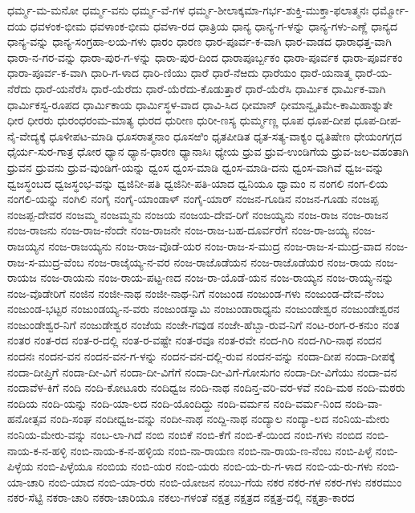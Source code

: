 ಧರ್ಮ್ಮ-ಮ-ಮನೋ
ಧರ್ಮ್ಮ-ವನು
ಧರ್ಮ್ಮ-ವೆ-ಗಳ
ಧರ್ಮ್ಮ-ಶೀಲಾಕ್ಕಮಾ-ಗರ್ಭ-ಶುಕ್ತಿ-ಮುಕ್ತಾ-ಫಲಾತ್ಮನಃ
ಧರ್ಮ್ಮೋ-ದಯ
ಧವಳಂಕ-ಭೀಮ
ಧವಳಾಂಕ-ಭೀಮ
ಧವಳಾ-ರದ
ಧಾತ್ರಿಯ
ಧಾನ್ಯ
ಧಾನ್ಯ-ಗ-ಳನ್ನು
ಧಾನ್ಯ-ಗಳು-ಎಣ್ಣೆ
ಧಾನ್ಯದ
ಧಾನ್ಯ-ವನ್ನು
ಧಾನ್ಯ-ಸಂಗ್ರಹಾ-ಲಯ-ಗಳು
ಧಾರಂ
ಧಾರಣ
ಧಾರ-ಪೂರ್ವ-ಕ-ವಾಗಿ
ಧಾರ-ವಾಡದ
ಧಾರಾಧತ್ತ-ವಾಗಿ
ಧಾರಾ-ನ-ಗರ-ವನ್ನು
ಧಾರಾ-ಪುರ-ಗ-ಳನ್ನು
ಧಾರಾ-ಪುರ-ದಿಂದ
ಧಾರಾಪೂರ್ಬ್ಬಕಂ
ಧಾರಾ-ಪೂರ್ವಕ
ಧಾರಾ-ಪೂರ್ವಕಂ
ಧಾರಾ-ಪೂರ್ವ-ಕ-ವಾಗಿ
ಧಾರಿ-ಗ-ಳಾದ
ಧಾರಿ-ಣಿಯು
ಧಾರೆ
ಧಾರೆ-ನೆಱದು
ಧಾರೆಯಂ
ಧಾರೆ-ಯನಾತ್ಮ
ಧಾರೆ-ಯ-ನೆರೆದು
ಧಾರೆ-ಯನೆರೆಸಿ
ಧಾರೆ-ಯೆರೆದು
ಧಾರೆ-ಯೆರೆದು-ಕೊಡುತ್ತಾರೆ
ಧಾರೆ-ಯೆರೆಸಿ
ಧಾರ್ಮಿಕ
ಧಾರ್ಮಿಕ-ವಾಗಿ
ಧಾರ್ಮಿಕಸ್ವ-ರೂಪದ
ಧಾರ್ಮಿಕಾಯ
ಧಾರ್ಮಿಸ್ಥಳ-ವಾದ
ಧಾವಿ-ಸಿದ
ಧೀಮಾನ್
ಧೀಮಾನ್ವೃತಿಮೇ-ಕಾಮಿಹಾಶ್ನುತೇ
ಧೀರ
ಧೀರರು
ಧುರಂಧರಂಮ-ಮಾತ್ಯ
ಧುರದ
ಧುರೀಣ
ಧುರೀ-ಣಸ್ಯ
ಧುರ್ಮ್ಮಣ್ಣ
ಧೂಪ
ಧೂಪ-ದೀಪ
ಧೂಪ-ದೀಪ-ನೈ-ವೇದ್ಯಕ್ಕೆ
ಧೂಳೀಪಟ-ಮಾಡಿ
ಧೂಸರಾತ್ಮನಾಂ
ಧೂಸಱಿಂ
ಧೃತಪೀಡಿತ
ಧೃತ-ಸತ್ಯ-ವಾಕ್ಯಂ
ಧೃತಿಷೇಣ
ಧೇಯಂಗಗ್ಗದ
ಧೈರ್ಯ-ಸುರ-ಗಾತ್ರ
ಧೋರ
ಧ್ಯಾನ
ಧ್ಯಾನ-ಧಾರಣ
ಧ್ಯಾನಾಸಿಃ
ಧ್ಯೇಯ
ಧ್ರುವ
ಧ್ರುವ-ಉಂಡಿಗೆಯ
ಧ್ರುವ-ಜಲ-ವಹಂತಾಗಿ
ಧ್ರುವನ
ಧ್ರುವನು
ಧ್ರುವ-ವುಂಡಿಗೆ-ಯನ್ನು
ಧ್ವಂಸ
ಧ್ವಂಸ-ಮಾಡಿ
ಧ್ವಂಸ-ಮಾಡಿ-ದನು
ಧ್ವಂಸ-ವಾಗಿವೆ
ಧ್ವಜ-ವನ್ನು
ಧ್ವಜಸ್ಥಂಬದ
ಧ್ವಜಸ್ಥಂಭ-ವನ್ನು
ಧ್ವಜಿನೀ-ಪತಿ
ಧ್ವಜಿನೀ-ಪತಿ-ಯಾದ
ಧ್ವನಿಯೂ
ಧ್ವಾಮಂ
ನ
ನಂಗಲಿ
ನಂಗ-ಲಿಯ
ನಂಗಲಿ-ಯನ್ನು
ನಂಗಿಲಿ
ನಂಗೈ
ನಂಗೈ-ಯಾಂಡಾಳ್
ನಂಗೈ-ಯಾರ್
ನಂಜನ-ಗೂಡಿನ
ನಂಜನ-ಗೂಡು
ನಂಜಪ್ಪ
ನಂಜಪ್ಪ-ದೇವರ
ನಂಜಮ್ಮ
ನಂಜಮ್ಮನು
ನಂಜಯ
ನಂಜಯ-ದೇವ-ರಿಗೆ
ನಂಜಯ್ಯನು
ನಂಜ-ರಾಜ
ನಂಜ-ರಾಜನ
ನಂಜ-ರಾಜನು
ನಂಜ-ರಾಜ-ನೆಂದೇ
ನಂಜ-ರಾಜನೇ
ನಂಜ-ರಾಜ-ಬಹ-ದೂರ್ವರೆಗೆ
ನಂಜ-ರಾ-ಜಯ್ಯ
ನಂಜ-ರಾಜಯ್ಯನ
ನಂಜ-ರಾಜಯ್ಯನು
ನಂಜ-ರಾಜ-ವೊಡೆ-ಯರ
ನಂಜ-ರಾಜ-ಸ-ಮುದ್ರ
ನಂಜ-ರಾಜ-ಸ-ಮುದ್ರ-ವಾದ
ನಂಜ-ರಾಜ-ಸ-ಮುದ್ರ-ವೆಂಬ
ನಂಜ-ರಾಜೈಯ್ಯ-ನ-ವರ
ನಂಜ-ರಾಜೊಡೆಯನ
ನಂಜ-ರಾಜೊಡೆಯರ
ನಂಜ-ರಾಯ
ನಂಜ-ರಾಯಜ
ನಂಜ-ರಾಯನು
ನಂಜ-ರಾಯ-ಪಟ್ಟ-ಣದ
ನಂಜ-ರಾ-ಯೊಡೆ-ಯನ
ನಂಜ-ರಾಯ್ಯನ
ನಂಜ-ರಾಯ್ಯ-ನನ್ನು
ನಂಜ-ವೊಡೇರಿಗೆ
ನಂಜಿನ
ನಂಜೀ-ನಾಥ
ನಂಜೀ-ನಾಥ-ನಿಗೆ
ನಂಜುಂಡ
ನಂಜುಂಡ-ಗಳು
ನಂಜುಂಡ-ದೇವ-ನೆಂಬ
ನಂಜುಂಡ-ಭಟ್ಟರ
ನಂಜುಂಡಯ್ಯ-ನ-ವರು
ನಂಜುಂಡಸ್ವಾಮಿ
ನಂಜುಂಡಾರಾಧ್ಯನು
ನಂಜುಂಡೇಶ್ವರ
ನಂಜುಂಡೇಶ್ವರನ
ನಂಜುಂಡೇಶ್ವರ-ನಿಗೆ
ನಂಜುಡೇಶ್ವರ
ನಂಜೆಯ
ನಂಜೇ-ಗವುಡ
ನಂಜೇ-ಹೆಬ್ಬಾ-ರುವ-ನಿಗೆ
ನಂಟ-ರಂಗ-ರ-ಕನುಂ
ನಂತ
ನಂತರ
ನಂತ-ರದ
ನಂತ-ರ-ದಲ್ಲಿ
ನಂತ-ರ-ವಷ್ಟೇ
ನಂತ-ರವೂ
ನಂತ-ರವೇ
ನಂದ-ಗಿರಿ
ನಂದ-ಗಿರಿ-ನಾಥ
ನಂದನ
ನಂದನಃ
ನಂದನ-ವನ
ನಂದನ-ವನ-ಗ-ಳನ್ನು
ನಂದನ-ವನ-ದಲ್ಲಿ-ರುವ
ನಂದನ-ವನ್ನು
ನಂದಾ-ದೀಪ
ನಂದಾ-ದೀಪಕ್ಕೆ
ನಂದಾ-ದೀಪ್ತಿಗೆ
ನಂದಾ-ದೀ-ವಿಗೆ
ನಂದಾ-ದೀ-ವಿಗೆಗೆ
ನಂದಾ-ದೀ-ವಿಗೆ-ಗೋಸುಗಂ
ನಂದಾ-ದೀ-ವಿಗೆಯು
ನಂದಾ-ವನ
ನಂದಾವೆಳ-ಕಿಗೆ
ನಂದಿ
ನಂದಿ-ಕೋಟೂರು
ನಂದಿಧ್ವಜ
ನಂದಿ-ನಾಥ
ನಂದಿನ್ತ-ವರಿ-ವರ-ಳವೆ
ನಂದಿ-ಮಠ
ನಂದಿ-ಮಠರು
ನಂದಿಯ
ನಂದಿ-ಯನ್ನು
ನಂದಿ-ಯಾ-ಲದ
ನಂದಿ-ಯೊಂದಿದ್ದು
ನಂದಿ-ವರ್ಮನ
ನಂದಿ-ವರ್ಮ-ನಿಂದ
ನಂದಿ-ವಾ-ಹನೋತ್ಸವ
ನಂದಿ-ಸಂಘ
ನಂದೀಧ್ವಜ-ವನ್ನು
ನಂದೀ-ನಾಥ
ನಂದ್ದಿ-ನಾಥ
ನಂದ್ಯಾಲ
ನಂದ್ಯಾ-ಲದ
ನಂನಿಯ-ಮೇರು
ನಂನಿಯ-ಮೇರು-ವನ್ನು
ನಂಬ-ಲಾ-ಗಿದೆ
ನಂಬಿ
ನಂಬಿಕೆ
ನಂಬಿ-ಕೆಗೆ
ನಂಬಿ-ಕೆ-ಯಿಂದ
ನಂಬಿ-ಗಳು
ನಂಬಿದ
ನಂಬಿ-ನಾಯ-ಕ-ನ-ಹಳ್ಳಿ
ನಂಬಿ-ನಾಯ-ಕ-ನ-ಹಳ್ಳಿಯ
ನಂಬಿ-ನಾ-ರಾಯಣ
ನಂಬಿ-ನಾ-ರಾಯ-ಣ-ನೆಂಬ
ನಂಬಿ-ಪಿಳ್ಳೆ
ನಂಬಿ-ಪಿಳ್ಳೆಯ
ನಂಬಿ-ಪಿಳ್ಳೆಯೂ
ನಂಬಿಯ
ನಂಬಿ-ಯರ
ನಂಬಿ-ಯರು
ನಂಬಿ-ಯ-ರು-ಗ-ಳಾದ
ನಂಬಿ-ಯ-ರು-ಗಳು
ನಂಬಿ-ಯಾ-ಚಾರಿ
ನಂಬಿ-ಯಾದ
ನಂಬಿ-ಯಾ-ರರು
ನಂಬಿ-ಯೋಜನ
ನಂಬು-ಗೆಯ
ನಕರ
ನಕರ-ಗಳ
ನಕರ-ಗಳು
ನಕರಮುಂ
ನಕರ-ಸೆಟ್ಟಿ
ನಕರಾ-ಚಾರಿ
ನಕರಾ-ಚಾರಿಯೂ
ನಕಲು-ಗಳಂತೆ
ನಕ್ಷತ್ರ
ನಕ್ಷತ್ರದ
ನಕ್ಷತ್ರ-ದಲ್ಲಿ
ನಕ್ಷತ್ರಾ-ಕಾರದ
